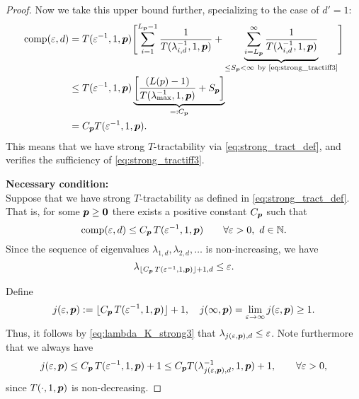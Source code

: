 \documentclass[11pt,a4paper]{article}
\begin{document}
\begin{proof}
Now we take this upper bound further, specializing to the case of $d'=1$:
\begin{align*}
       \operatorname{comp}(\varepsilon,d)
       & = T(\varepsilon^{-1},1, \boldsymbol{p}) \Biggl [ \sum_{i=1}^{L_{\boldsymbol{p}}-1} \frac{1}{T(\lambda_{i, d}^{-1},1,\boldsymbol{p})}
       + \underbrace{\sum_{i=L_{\boldsymbol{p}}}^\infty \frac{1}{T(\lambda_{i, d}^{-1},1,\boldsymbol{p})}}_{\le S_{\boldsymbol{p}} <\infty\ \text{by \eqref{eq:strong_tractiff3}} }\Biggr] \\
       & \le T(\varepsilon^{-1},1,\boldsymbol{p}) \underbrace{\left[\frac{(L(p)-1)}{T(\lambda_{\max}^{-1},1,\boldsymbol{p})} + S_{\boldsymbol{p}}\right]}_{=:C_{\boldsymbol{p}}}\\
       & =  C_{\boldsymbol{p}}T(\varepsilon^{-1},1,\boldsymbol{p}).
\end{align*}
This means that we have strong $T$-tractability via \eqref{eq:strong_tract_def}, and verifies the sufficiency of \eqref{eq:strong_tractiff3}.



\bigskip
\noindent \textbf{Necessary condition:} \\
Suppose that we have strong
$T$-tractability as defined in \eqref{eq:strong_tract_def}. That is, for some $\boldsymbol{p} \ge \boldsymbol{0}$ there exists a positive constant $C_{\boldsymbol{p}}$ such that
\[
\operatorname{comp}(\varepsilon,d)\le C_{\boldsymbol{p}}\, T(\varepsilon^{-1},1,\boldsymbol{p})
\qquad \forall \varepsilon > 0, \ d \in \mathbb{N}.
\]
Since the sequence of eigenvalues $\lambda_{1,d}, \lambda_{2,d}, \ldots $ is non-increasing, we have
\begin{equation}\label{eq:lambda_K_strong3}
\lambda_{\lfloor C_{\boldsymbol{p}}\, T(\varepsilon^{-1},1,\boldsymbol{p})\rfloor +1,d}\le \varepsilon.
\end{equation}

Define
\[
j (\varepsilon,\boldsymbol{p}):= \lfloor C_{\boldsymbol{p}}\, T(\varepsilon^{-1},1,\boldsymbol{p})\rfloor +1, \quad
j (\infty,\boldsymbol{p}) = \lim_{\varepsilon \to \infty} j (\varepsilon,\boldsymbol{p}) \ge 1 .
\]
Thus, it follows by \eqref{eq:lambda_K_strong3} that $\lambda_{j(\varepsilon,\boldsymbol{p}),d} \le \varepsilon$.
Note furthermore that we always have
\[
j(\varepsilon,\boldsymbol{p})\le C_{\boldsymbol{p}}\, T(\varepsilon^{-1},1,\boldsymbol{p})+1 \le C_{\boldsymbol{p}} T(\lambda_{j(\varepsilon,\boldsymbol{p}),d}^{-1},1,\boldsymbol{p})+1, \qquad \forall \varepsilon > 0,
\]
since
$T(\cdot,1, \boldsymbol{p})$ is non-decreasing.


\end{proof}
\end{document}
